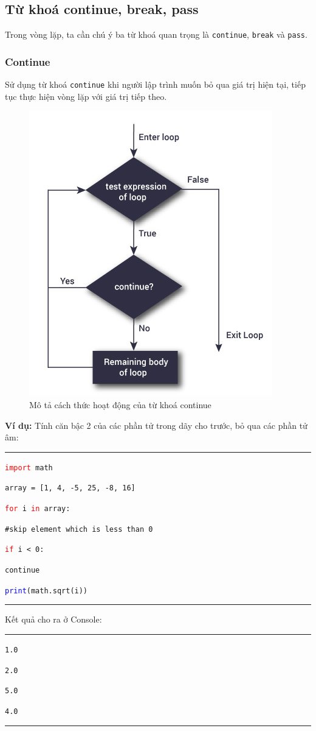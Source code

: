 \subsection{Từ khoá continue, break, pass}
\label{keyloop}
Trong vòng lặp, ta cần chú ý ba từ khoá quan trọng là \texttt{continue}, \texttt{break} và \texttt{pass}.
\subsubsection{Continue}
Sử dụng từ khoá \texttt{continue} khi người lập trình muốn bỏ qua giá trị hiện tại, tiếp tục thực hiện vòng lặp với giá trị tiếp theo.\par
\begin{figure}[h]
	\centering
	\includegraphics[width=0.4\linewidth]{img/continue}
	\caption{Mô tả cách thức hoạt động của từ khoá continue}
\end{figure}
\textbf{Ví dụ:} Tính căn bậc 2 của các phần tử trong dãy cho trước, bỏ qua các phần tử âm:\\
\rule{\linewidth}{0.2mm}\par
\begin{linenumbers}
	\texttt{\textcolor{red}{import} math}\par
	\smallskip
	\texttt{array = [1, 4, -5, 25, -8, 16]}\par
	\texttt{\textcolor{red}{for} i \textcolor{red}{in} array:}\par
	\qquad\texttt{\#skip element which is less than 0}\par
	\qquad\texttt{\textcolor{red}{if} i < 0:}\par
	\qquad\qquad\texttt{continue}\par
	\qquad\texttt{\textcolor{blue}{print}(math.sqrt(i))}\par
\end{linenumbers}
\rule{\linewidth}{0.2mm}\par
\noindent
\resetlinenumber
Kết quả cho ra ở Console:\\
\rule{\linewidth}{0.2mm}\par
\begin{linenumbers}
	\texttt{1.0}\par
	\texttt{2.0}\par
	\texttt{5.0}\par
	\texttt{4.0}\par
\end{linenumbers}
\rule{\linewidth}{0.2mm}\par
\resetlinenumber
\newpage
